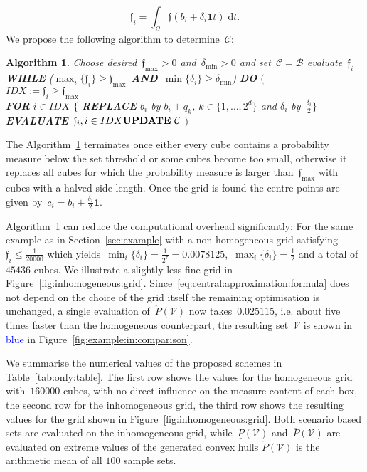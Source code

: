 \documentclass[letterpaper, 10pt, conference]{ieeeconf} %
\newtheorem{algo}[thm]{Algorithm}
\providecommand{\bfa}[1]{\mathbf{#1}}
\begin{document}
\[
\mathfrak{f}_i=\int_{\mathcal Q}\mathfrak{f}(b_i+\delta_i\bfa{1} t) \; \mathrm d t.
\]
%
We propose the following algorithm to determine~$\mathcal C$:
%
\begin{algo}\label{algo:non:homo:cubes}
Choose desired~$\mathfrak{f}_{\max}>0$ and~$\delta_{\min}>0$ and set~$\mathcal C=\mathcal B$ evaluate~$\mathfrak{f}_i$\\
\textbf{WHILE} ($\max_i\{\mathfrak{f}_i\}\geq\mathfrak{f}_{\max}$~\textbf{AND}~$\min\{\delta_i\}\geq\delta_{\min}$) \textbf{DO} $\bigl($\\
$IDX := \mathfrak{f}_i\geq \mathfrak{f}_{\max}$\\
\textbf{FOR} $i\in IDX$ $\{$ \textbf{REPLACE} $b_i$ by $b_i+q_k$, $k\in\{1,\dots,2^d\}$ 
and $\delta_i$ by~$\frac{\delta_i}{2}\}$\\
\textbf{EVALUATE}~$\mathfrak f_i, i\in IDX\\
\textbf{UPDATE}~\mathcal C$
$\bigr)$
\end{algo}
%
The Algorithm~\ref{algo:non:homo:cubes} terminates once either every cube contains a probability measure below the set threshold or some cubes become too small, otherwise it replaces all cubes for which the probability measure is larger than~$\mathfrak{f}_{\max}$ with cubes with a halved side length.
%
Once the grid is found the centre points are given by~$c_i=b_i+\frac{\delta_i}{2}\bfa{1}$.
%


%
Algorithm~\ref{algo:non:homo:cubes} can reduce the computational overhead significantly:
%
For the same example as in Section~\ref{sec:example} with a non-homogeneous grid satisfying~$\mathfrak{f}_i\leq\frac{1}{20000}$ which yields~$\min_i\{\delta_i\}=\frac{1}{2^7}=0.0078125$,~$\max_i\{\delta_i\}=\frac{1}{2}$ and a total of~$45436$ cubes.
%
We illustrate a slightly less fine grid in Figure~\ref{fig:inhomogeneous:grid}.
%
Since~\eqref{eq:central:approximation:formula} does not depend on the choice of the grid itself the remaining optimisation is unchanged, a single evaluation of~$\mathring{P}(\mathcal V)$ now takes~$0.025115$, i.e. about five times  faster than the homogeneous counterpart, the resulting set~$\mathcal V$ is shown in \textcolor{blue}{blue} in Figure~\ref{fig:example:in:comparison}.
%


%
We summarise the numerical values of the proposed schemes in Table~\ref{tab:only:table}.
%
The first row shows the values for the homogeneous grid with~$160000$ cubes, with no direct influence on the measure content of each box, the second row for the inhomogeneous grid, the third row shows the resulting values for the grid shown in Figure~\ref{fig:inhomogeneous:grid}. 
%
Both scenario based sets are evaluated on the inhomogeneous grid, while~$\underline{P}(\mathcal V)$ and~$\overline{P}(\mathcal V)$ are evaluated on extreme values of the generated convex hulls $\mathring{P}(\mathcal V)$ is the arithmetic mean of all $100$ sample sets.
%
\end{document}
